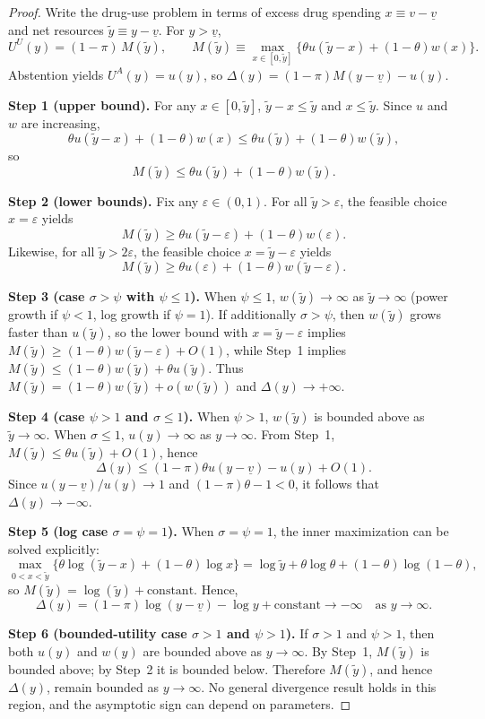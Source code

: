 \begin{proof}
Write the drug-use problem in terms of excess drug spending $x\equiv v-\underline v$ and net resources
$\tilde y\equiv y-\underline v$. For $y>\underline v$,
\[
U^{U}(y)=(1-\pi)\,M(\tilde y),
\qquad
M(\tilde y)\equiv \max_{x\in[0,\tilde y]}\Big\{\theta u(\tilde y-x)+(1-\theta)w(x)\Big\}.
\]
Abstention yields $U^{A}(y)=u(y)$, so $\Delta(y)=(1-\pi)M(y-\underline v)-u(y)$.

\medskip
\noindent\textbf{Step 1 (upper bound).}
For any $x\in[0,\tilde y]$, $\tilde y-x\le \tilde y$ and $x\le \tilde y$. Since $u$ and $w$ are increasing,
\[
\theta u(\tilde y-x)+(1-\theta)w(x)\le \theta u(\tilde y)+(1-\theta)w(\tilde y),
\]
so
\[
M(\tilde y)\le \theta u(\tilde y)+(1-\theta)w(\tilde y).
\]

\medskip
\noindent\textbf{Step 2 (lower bounds).}
Fix any $\varepsilon\in(0,1)$. For all $\tilde y>\varepsilon$, the feasible choice $x=\varepsilon$ yields
\[
M(\tilde y)\ge \theta u(\tilde y-\varepsilon)+(1-\theta)w(\varepsilon).
\]
Likewise, for all $\tilde y>2\varepsilon$, the feasible choice $x=\tilde y-\varepsilon$ yields
\[
M(\tilde y)\ge \theta u(\varepsilon)+(1-\theta)w(\tilde y-\varepsilon).
\]

\medskip
\noindent\textbf{Step 3 (case $\sigma>\psi$ with $\psi\le 1$).}
When $\psi\le 1$, $w(\tilde y)\to\infty$ as $\tilde y\to\infty$ (power growth if $\psi<1$, log growth if $\psi=1$).
If additionally $\sigma>\psi$, then $w(\tilde y)$ grows faster than $u(\tilde y)$, so the lower bound with $x=\tilde y-\varepsilon$ implies
$M(\tilde y)\ge (1-\theta)w(\tilde y-\varepsilon)+O(1)$, while Step~1 implies $M(\tilde y)\le (1-\theta)w(\tilde y)+\theta u(\tilde y)$.
Thus $M(\tilde y)=(1-\theta)w(\tilde y)+o(w(\tilde y))$ and $\Delta(y)\to +\infty$.

\medskip
\noindent\textbf{Step 4 (case $\psi>1$ and $\sigma\le 1$).}
When $\psi>1$, $w(\tilde y)$ is bounded above as $\tilde y\to\infty$.
When $\sigma\le 1$, $u(y)\to\infty$ as $y\to\infty$.
From Step~1, $M(\tilde y)\le \theta u(\tilde y)+O(1)$, hence
\[
\Delta(y)\le (1-\pi)\theta u(y-\underline v)-u(y)+O(1).
\]
Since $u(y-\underline v)/u(y)\to 1$ and $(1-\pi)\theta-1<0$, it follows that $\Delta(y)\to -\infty$.

\medskip
\noindent\textbf{Step 5 (log case $\sigma=\psi=1$).}
When $\sigma=\psi=1$, the inner maximization can be solved explicitly:
\[
\max_{0<x<\tilde y}\{\theta\log(\tilde y-x)+(1-\theta)\log x\}
=\log \tilde y + \theta\log\theta+(1-\theta)\log(1-\theta),
\]
so $M(\tilde y)=\log(\tilde y)+\text{constant}$. Hence,
\[
\Delta(y)=(1-\pi)\log(y-\underline v)-\log y+\text{constant}\to -\infty
\quad\text{as }y\to\infty.
\]

\medskip
\noindent\textbf{Step 6 (bounded-utility case $\sigma>1$ and $\psi>1$).}
If $\sigma>1$ and $\psi>1$, then both $u(y)$ and $w(y)$ are bounded above as $y\to\infty$.
By Step~1, $M(\tilde y)$ is bounded above; by Step~2 it is bounded below. Therefore $M(\tilde y)$, and hence $\Delta(y)$, remain bounded as $y\to\infty$.
No general divergence result holds in this region, and the asymptotic sign can depend on parameters.
\end{proof}

